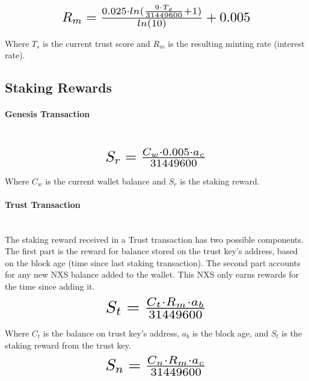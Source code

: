 \documentclass[11pt]{article}
\begin{document}
\begin{equation}
\resizebox{.65\hsize}{!}{$R_{m} = \frac{0.025 \cdot ln(\frac{9 \cdot T_{s}}{31449600} + 1)}{ln(10)} + 0.005$}
\end{equation}

\noindent Where $T_{s}$ is the current trust score and $R_{m}$ is the resulting minting rate (interest rate).\\


\subsection{Staking Rewards}
\paragraph{Genesis Transaction} ~\\
\begin{equation}
\resizebox{.35\hsize}{!}{$S_{r} = \frac{C_{w} \cdot 0.005 \cdot a_c}{31449600}$}
\end{equation}

\noindent Where $C_{w}$ is the current wallet balance and $S_{r}$ is the staking reward.

\paragraph{Trust Transaction} ~\\
The staking reward received in a Trust transaction has two possible components. The first part is the reward for balance stored on the trust key's address, based on the block age (time since last staking transaction). The second part accounts for any new NXS balance added to the wallet. This NXS only earns rewards for the time since adding it.\\

\begin{equation}
\resizebox{.35\hsize}{!}{$S_{t} = \frac{C_{t} \cdot R_{m} \cdot a_{b}}{31449600}$}
\end{equation}

\noindent Where $C_{t}$ is the balance on trust key's address, $a_{b}$ is the block age, and $S_{t}$ is the staking reward from the trust key.\\

\begin{equation}
\resizebox{.35\hsize}{!}{$S_{n} = \frac{C_{n} \cdot R_{m} \cdot a_c}{31449600}$}
\end{equation}
\end{document}
